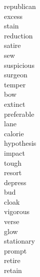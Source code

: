 \documentclass[b5paper, 11pt]{ctexart}
\begin{document}
\begin{multicols*}{3}
\begin{description}
\item[republican]

\item[excess]

\item[stain]

\item[reduction]

\item[satire]

\item[sew]

\item[suspicious]

\item[surgeon]

\item[temper]

\item[bow]

\item[extinct]

\item[preferable]

\item[lane]

\item[calorie]

\item[hypothesis]

\item[impact]

\item[tough]

\item[resort]

\item[depress]

\item[bud]

\item[cloak]

\item[vigorous]

\item[verse]

\item[glow]

\item[stationary]

\item[prompt]

\item[retire]

\item[retain]


\end{description}
\end{multicols*}
\end{document}
